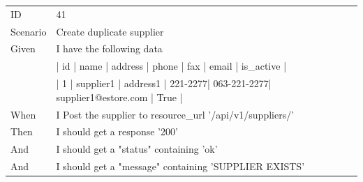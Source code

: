 \documentclass{report}
\begin{document}
\begin{tabular}{ l l }
ID 			& 41\\
Scenario		& Create duplicate supplier \\
Given 		& I have the following data \\
       		& | id | name        | address  | phone   | fax         | email                | is\_active | \\
       		& | 1  | supplier1   | address1 | 221-2277| 063-221-2277| supplier1@estore.com | True      | \\
When 		& I Post the supplier to resource\_url  '/api/v1/suppliers/' \\
Then 		& I should get a response '200' \\
And 			& I should get a "status" containing 'ok' \\
And 			& I should get a "message" containing 'SUPPLIER EXISTS' \\
\end{tabular}
\newpage
\end{document}
